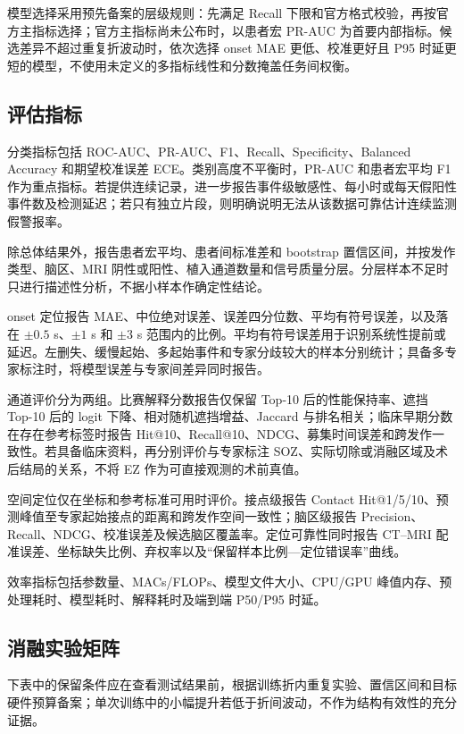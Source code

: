 模型选择采用预先备案的层级规则：先满足 Recall 下限和官方格式校验，再按官方主指标选择；官方主指标尚未公布时，以患者宏 PR-AUC 为首要内部指标。候选差异不超过重复折波动时，依次选择 onset MAE 更低、校准更好且 P95 时延更短的模型，不使用未定义的多指标线性和分数掩盖任务间权衡。

\subsection{评估指标}

分类指标包括 ROC-AUC、PR-AUC、F1、Recall、Specificity、Balanced Accuracy 和期望校准误差 ECE。类别高度不平衡时，PR-AUC 和患者宏平均 F1 作为重点指标。若提供连续记录，进一步报告事件级敏感性、每小时或每天假阳性事件数及检测延迟；若只有独立片段，则明确说明无法从该数据可靠估计连续监测假警报率。

除总体结果外，报告患者宏平均、患者间标准差和 bootstrap 置信区间，并按发作类型、脑区、MRI 阴性或阳性、植入通道数量和信号质量分层。分层样本不足时只进行描述性分析，不据小样本作确定性结论。

onset 定位报告 MAE、中位绝对误差、误差四分位数、平均有符号误差，以及落在 $\pm0.5$ s、$\pm1$ s 和 $\pm3$ s 范围内的比例。平均有符号误差用于识别系统性提前或延迟。左删失、缓慢起始、多起始事件和专家分歧较大的样本分别统计；具备多专家标注时，将模型误差与专家间差异同时报告。

通道评价分为两组。比赛解释分数报告仅保留 Top-10 后的性能保持率、遮挡 Top-10 后的 logit 下降、相对随机遮挡增益、Jaccard 与排名相关；临床早期分数在存在参考标签时报告 Hit@10、Recall@10、NDCG、募集时间误差和跨发作一致性。若具备临床资料，再分别评价与专家标注 SOZ、实际切除或消融区域及术后结局的关系，不将 EZ 作为可直接观测的术前真值。

空间定位仅在坐标和参考标准可用时评价。接点级报告 Contact Hit@1/5/10、预测峰值至专家起始接点的距离和跨发作空间一致性；脑区级报告 Precision、Recall、NDCG、校准误差及候选脑区覆盖率。定位可靠性同时报告 CT--MRI 配准误差、坐标缺失比例、弃权率以及“保留样本比例—定位错误率”曲线。

效率指标包括参数量、MACs/FLOPs、模型文件大小、CPU/GPU 峰值内存、预处理耗时、模型耗时、解释耗时及端到端 P50/P95 时延。

\subsection{消融实验矩阵}

下表中的保留条件应在查看测试结果前，根据训练折内重复实验、置信区间和目标硬件预算备案；单次训练中的小幅提升若低于折间波动，不作为结构有效性的充分证据。

